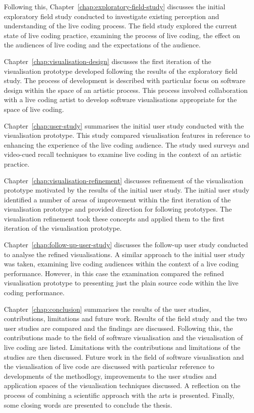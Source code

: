 Following this, Chapter~\ref{chap:exploratory-field-study} discusses the initial exploratory field study conducted to investigate existing perception and understanding of the live coding process. The field study explored the current state of live coding practice, examining the process of live coding, the effect on the audiences of live coding and the expectations of the audience.

Chapter~\ref{chap:visualisation-design} discusses the first iteration of the visualisation prototype developed following the results of the exploratory field study. The process of development is described with particular focus on software design within the space of an artistic process. This process involved collaboration with a live coding artist to develop software visualisations appropriate for the space of live coding.

Chapter~\ref{chap:user-study} summarises the initial user study conducted with the visualisation prototype. This study compared visualisation features in reference to enhancing the experience of the live coding audience. The study used surveys and video-cued recall techniques to examine live coding in the context of an artistic practice.

Chapter~\ref{chap:visualisation-refinement} discusses refinement of the visualisation prototype motivated by the results of the initial user study. The initial user study identified a number of areas of improvement within the first iteration of the visualisation prototype and provided direction for following prototypes. The visualisation refinement took these concepts and applied them to the first iteration of the visualisation prototype.

Chapter~\ref{chap:follow-up-user-study} discusses the follow-up user study conducted to analyse the refined visualisations. A similar approach to the initial user study was taken, examining live coding audiences within the context of a live coding performance. However, in this case the examination compared the refined visualisation prototype to presenting just the plain source code within the live coding performance.

Chapter~\ref{chap:conclusion} summarises the results of the user studies, contributions, limitations and future work. Results of the field study and the two user studies are compared and the findings are discussed. Following this, the contributions made to the field of software visualisation and the visualisation of live coding are listed. Limitations with the contributions and limitations of the studies are then discussed. Future work in the field of software visualisation and the visualisation of live code are discussed with particular reference to developments of the methodlogy, improvements to the user studies and application spaces of the visualisation techniques discussed. A reflection on the process of combining a scientific approach with the arts is presented. Finally, some closing words are presented to conclude the thesis.


